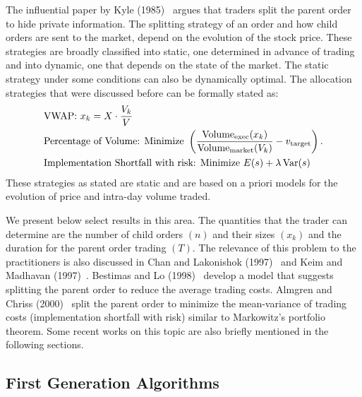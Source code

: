 The influential paper by Kyle (1985)~\cite{kyle1985} argues that traders split the parent order to hide private information. The splitting strategy of an order and how child orders are sent to the market, depend on the evolution of the stock price. These strategies are broadly classified into static, one determined in advance of trading and into dynamic, one that depends on the state of the market. The static strategy under some conditions can also be dynamically optimal. The allocation strategies that were discussed before can be formally stated as:
	\[
	\begin{aligned}
	&\text{VWAP: } x_k= X \cdot \dfrac{V_k}{V} \\
	&\text{Percentage of Volume: Minimize } \left( \dfrac{\text{Volume}_{\text{exec}}(x_k)}{\text{Volume}_{\text{market}}(V_k)} - v_{\text{target}} \right). \\
	&\text{Implementation Shortfall with risk: Minimize } E(s) + \lambda \operatorname{Var}(s)
	\end{aligned}
	\]
These strategies as stated are static and are based on a priori models for the evolution of price and intra-day volume traded. 


We present below select results in this area. The quantities that the trader can determine are the number of child orders $(n)$ and their sizes $(x_k)$ and the duration for the parent order trading $(T)$. The relevance of this problem to the practitioners is also discussed in Chan and Lakonishok (1997)~\cite{lakon} and Keim and Madhavan (1997)~\cite{madhavan}. Bestimas and Lo (1998)~\cite{berlo} develop a model that suggests splitting the parent order to reduce the average trading costs. Almgren and Chriss (2000)~\cite{alm2000} split the parent order to minimize the mean-variance of trading costs (implementation shortfall with risk) similar to Markowitz's portfolio theorem. Some recent works on this topic are also briefly mentioned in the following sections.


\subsection{First Generation Algorithms\label{sec:first_gen}}

